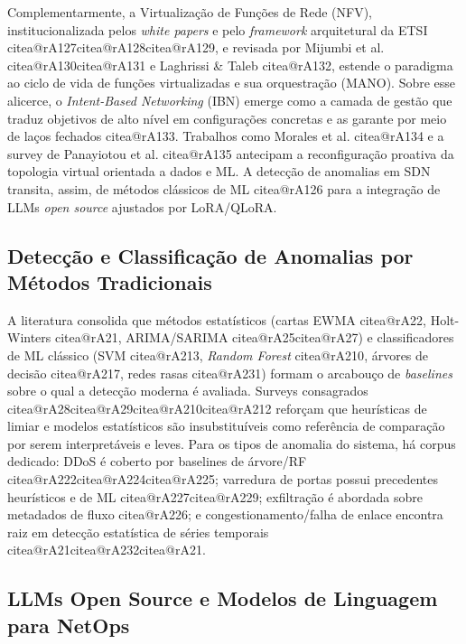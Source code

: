 \documentclass[12pt,a4paper]{article}
\makeatletter
\newcommand{\citea}[1]{\begingroup\edef\@currentlabel{\csname citea@#1\endcsname}\@currentlabel\endgroup}
\makeatother
\begin{document}
Complementarmente, a Virtualização de Funções de Rede (NFV), institucionalizada
pelos \textit{white papers} e pelo \textit{framework} arquitetural da ETSI
\citea{rA127}\citea{rA128}\citea{rA129}, e revisada por Mijumbi et al. \citea{rA130}\citea{rA131} e Laghrissi \&
Taleb \citea{rA132}, estende o paradigma ao ciclo de vida de funções virtualizadas e
sua orquestração (MANO). Sobre esse alicerce, o \textit{Intent-Based
Networking} (IBN) emerge como a camada de gestão que traduz objetivos de alto
nível em configurações concretas e as garante por meio de laços fechados
\citea{rA133}. Trabalhos como Morales et al. \citea{rA134} e a survey de Panayiotou et al.
\citea{rA135} antecipam a reconfiguração proativa da topologia virtual orientada a
dados e ML. A detecção de anomalias em SDN transita, assim, de métodos
clássicos de ML \citea{rA126} para a integração de LLMs \textit{open source}
ajustados por LoRA/QLoRA.

\subsection{Detecção e Classificação de Anomalias por Métodos Tradicionais}
\label{sec:ml}

A literatura consolida que métodos estatísticos (cartas EWMA \citea{rA22}, Holt-Winters
\citea{rA21}, ARIMA/SARIMA \citea{rA25}\citea{rA27}) e classificadores de ML clássico (SVM
\citea{rA213}, \textit{Random Forest} \citea{rA210}, árvores de decisão \citea{rA217}, redes
rasas \citea{rA231}) formam o arcabouço de \textit{baselines} sobre o qual a detecção
moderna é avaliada. Surveys consagrados \citea{rA28}\citea{rA29}\citea{rA210}\citea{rA212} reforçam que
heurísticas de limiar e modelos estatísticos são insubstituíveis como
referência de comparação por serem interpretáveis e leves. Para os tipos de
anomalia do sistema, há corpus dedicado: DDoS é coberto por baselines de
árvore/RF \citea{rA222}\citea{rA224}\citea{rA225}; varredura de portas possui precedentes
heurísticos e de ML \citea{rA227}\citea{rA229}; exfiltração é abordada sobre metadados
de fluxo \citea{rA226}; e congestionamento/falha de enlace encontra raiz em detecção
estatística de séries temporais \citea{rA21}\citea{rA232}\citea{rA21}.

\subsection{LLMs Open Source e Modelos de Linguagem para NetOps}
\label{sec:llm}
\end{document}
